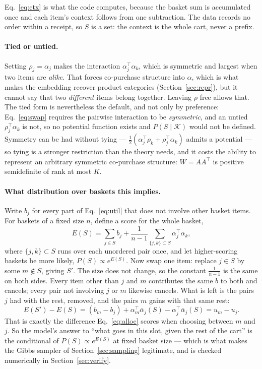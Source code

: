 \documentclass[11pt]{article}
\begin{document}
Eq.~\ref{eq:ctx} is what the code computes, because the basket sum is accumulated once and
each item's context follows from one subtraction. The data records no order within a
receipt, so $S$ is a set: the context is the whole cart, never a prefix.

\paragraph{Tied or untied.} Setting $\rho_j=\alpha_j$ makes the interaction
$\alpha_j^{\top}\alpha_k$, which is symmetric and largest when two items are \emph{alike}.
That forces co-purchase structure into $\alpha$, which is what makes the embedding recover
product categories (Section~\ref{sec:repr}), but it cannot say that two \emph{different}
items belong together. Leaving $\rho$ free allows that. The tied form is nevertheless the
default, and not only by preference: Eq.~\ref{eq:swap} requires the pairwise interaction to
be \emph{symmetric}, and an untied $\rho_j^{\top}\alpha_k$ is not, so no potential function
exists and $P(S\mid\mathcal K)$ would not be defined. Symmetry can be had without tying ---
$\tfrac12(\alpha_j^{\top}\rho_k+\rho_j^{\top}\alpha_k)$ admits a potential --- so tying is
a stronger restriction than the theory needs, and it costs the ability to represent an
arbitrary symmetric co-purchase structure: $W=AA^{\top}$ is positive semidefinite of rank at
most $K$.

\paragraph{What distribution over baskets this implies.} Write $b_j$ for every part of
Eq.~\ref{eq:util} that does not involve other basket items. For baskets of a fixed size
$n$, define a score for the whole basket,
\begin{equation}
E(S)=\sum_{j\in S}b_j+\frac{1}{n-1}\sum_{\{j,k\}\subset S}\alpha_j^{\top}\alpha_k ,
\label{eq:energy}
\end{equation}
where $\{j,k\}\subset S$ runs over each unordered pair once, and let higher-scoring
baskets be more likely, $P(S)\propto e^{E(S)}$. Now swap one item: replace $j\in S$ by
some $m\notin S$, giving $S'$. The size does not change, so the constant $\tfrac1{n-1}$ is
the same on both sides. Every item other than $j$ and $m$ contributes the same $b$ to both
and cancels; every pair not involving $j$ or $m$ likewise cancels. What is left is the
pairs $j$ had with the rest, removed, and the pairs $m$ gains with that same rest:
\begin{equation}
E(S')-E(S)=(b_m-b_j)+\alpha_m^{\top}\bar\alpha_j(S)-\alpha_j^{\top}\bar\alpha_j(S)=u_m-u_j .
\label{eq:swap}
\end{equation}
That is exactly the difference Eq.~\ref{eq:alloc} scores when choosing between $m$ and
$j$. So the model's answer to ``what goes in this slot, given the rest of the cart'' is
the conditional of $P(S)\propto e^{E(S)}$ at fixed basket size --- which is what makes the
Gibbs sampler of Section~\ref{sec:sampling} legitimate, and is checked numerically in
Section~\ref{sec:verify}.
\end{document}
